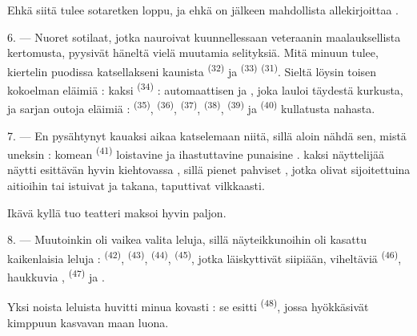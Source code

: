 Ehkä siitä tulee sotaretken loppu, ja ehkä on  jälkeen
mahdollista allekirjoittaa .

\VUsaut{4.4mm}
\VUsaut{2.8mm}

6. --- Nuoret sotilaat, jotka nauroivat kuunnellessaan veteraanin
maalauksellista kertomusta, pyysivät häneltä vielä muutamia selityksiä. Mitä
minuun tulee, kiertelin puodissa katsellakseni kaunista 
\textsuperscript{(32)} ja  \textsuperscript{(33)}
 \textsuperscript{(31)}. Sieltä löysin toisen kokoelman
eläimiä : kaksi  \textsuperscript{(34)} : automaattisen
 ja , joka lauloi täydestä kurkusta, ja
sarjan outoja eläimiä :  \textsuperscript{(35)},
 \textsuperscript{(36)}, 
\textsuperscript{(37)},  \textsuperscript{(38)},
 \textsuperscript{(39)} ja 
\textsuperscript{(40)} kullatusta nahasta.

7. --- En pysähtynyt kauaksi aikaa katselemaan niitä, sillä aloin nähdä sen,
mistä uneksin : komean  \textsuperscript{(41)} loistavine
 ja ihastuttavine punaisine .
 kaksi näyttelijää näytti esittävän  hyvin
kiehtovassa , sillä pienet pahviset ,
jotka olivat sijoitettuina aitioihin tai istuivat  ja
  takana, taputtivat vilkkaasti.

Ikävä kyllä tuo teatteri maksoi hyvin paljon.

8. --- Muutoinkin oli vaikea valita leluja, sillä näyteikkunoihin oli kasattu
kaikenlaisia leluja :  \textsuperscript{(42)},
 \textsuperscript{(43)}, 
\textsuperscript{(44)},  \textsuperscript{(45)}, jotka
läiskyttivät siipiään, viheltäviä 
\textsuperscript{(46)}, haukkuvia , 
\textsuperscript{(47)} ja .


Yksi noista leluista huvitti minua kovasti : se esitti 
\textsuperscript{(48)}, jossa  hyökkäsivät 
kimppuun  kasvavan maan luona.

